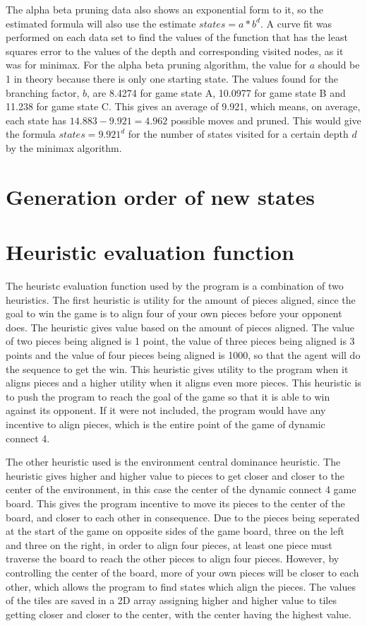 \documentclass[11pt]{article}
\begin{document}
The alpha beta pruning data also shows an exponential form to it, so the estimated formula will also use the estimate $ states = a*b^d $. A curve fit was performed on each data set to find the values of the function that has the least squares error to the  values of the depth and corresponding visited nodes, as it was for minimax. For the alpha beta pruning algorithm, the value for $a$ should be 1 in theory because there is only one starting state. The values found for the branching factor, $b$, are 8.4274 for game state A, 10.0977 for game state B and 11.238 for game state C. This gives an average of 9.921, which means, on average, each state has $14.883-9.921=4.962$ possible moves and pruned. This would give the formula $ states = 9.921^d $ for the number of states visited for a certain depth $d$ by the minimax algorithm. 

\section{Generation order of new states}


\section{Heuristic evaluation function}
The heuristc evaluation function used by the program is a combination of two heuristics. The first heuristic is utility for the amount of pieces aligned, since the goal to win the game is to align four of your own pieces before your opponent does. The heuristic gives value based on the amount of pieces aligned. The value of two pieces being aligned is 1 point, the value of three pieces being aligned is 3 points and the value of four pieces being aligned is 1000, so that the agent will do the sequence to get the win. This heuristic gives utility to the program when it aligns pieces and a higher utility when it aligns even more pieces. This heuristic is to push the program to reach the goal of the game so that it is able to win against its opponent. If it were not included, the program would have any incentive to align pieces, which is the entire point of the game of dynamic connect 4.

The other heuristic used is the environment central dominance heuristic. The heuristic gives higher and higher value to pieces to get closer and closer to the center of the 
environment, in this case the center of the dynamic connect 4 game board. This gives the program incentive to move its pieces to the center of the board, and closer to each other in consequence. Due to the pieces being seperated at the start of the game on opposite sides of the game board, three on the left and three on the right, in order to align four pieces, at least one piece must traverse the board to reach the other pieces to align four pieces. However, by controlling the center of the board, more of your own pieces will be closer to each other, which allows the program to find states which align the pieces. The values of the tiles are saved in a 2D array assigning higher and higher value to tiles getting closer and closer to the center, with the center having the highest value.
\end{document}
